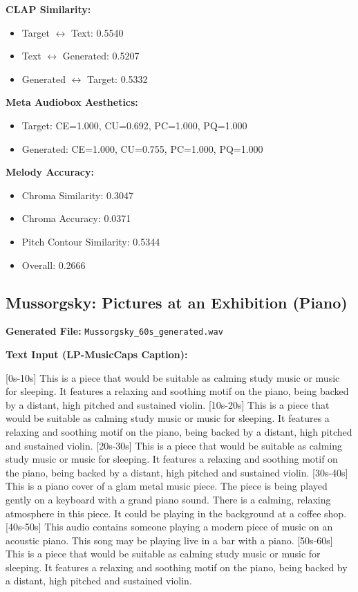 \documentclass{article}
\begin{document}
\textbf{CLAP Similarity:}
\begin{itemize}
    \item Target $\leftrightarrow$ Text: 0.5540
    \item Text $\leftrightarrow$ Generated: 0.5207
    \item Generated $\leftrightarrow$ Target: 0.5332
\end{itemize}

\textbf{Meta Audiobox Aesthetics:}
\begin{itemize}
    \item Target: CE=1.000, CU=0.692, PC=1.000, PQ=1.000
    \item Generated: CE=1.000, CU=0.755, PC=1.000, PQ=1.000
\end{itemize}

\textbf{Melody Accuracy:}
\begin{itemize}
    \item Chroma Similarity: 0.3047
    \item Chroma Accuracy: 0.0371
    \item Pitch Contour Similarity: 0.5344
    \item Overall: 0.2666
\end{itemize}

\subsection{Mussorgsky: Pictures at an Exhibition (Piano)}

\textbf{Generated File:} \texttt{Mussorgsky\_60s\_generated.wav}

\textbf{Text Input (LP-MusicCaps Caption):}

\small
[0s-10s] This is a piece that would be suitable as calming study music or music for sleeping. It features a relaxing and soothing motif on the piano, being backed by a distant, high pitched and sustained violin. [10s-20s] This is a piece that would be suitable as calming study music or music for sleeping. It features a relaxing and soothing motif on the piano, being backed by a distant, high pitched and sustained violin. [20s-30s] This is a piece that would be suitable as calming study music or music for sleeping. It features a relaxing and soothing motif on the piano, being backed by a distant, high pitched and sustained violin. [30s-40s] This is a piano cover of a glam metal music piece. The piece is being played gently on a keyboard with a grand piano sound. There is a calming, relaxing atmosphere in this piece. It could be playing in the background at a coffee shop. [40s-50s] This audio contains someone playing a modern piece of music on an acoustic piano. This song may be playing live in a bar with a piano. [50s-60s] This is a piece that would be suitable as calming study music or music for sleeping. It features a relaxing and soothing motif on the piano, being backed by a distant, high pitched and sustained violin.
\normalsize
\end{document}
